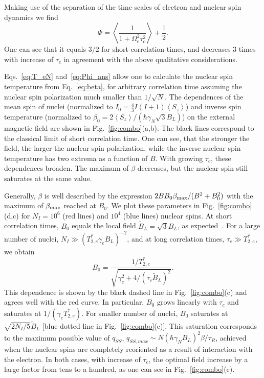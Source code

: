 \documentclass[prl,nobibnotes,twocolumn,aps,longbibliography,superscriptaddress,notoc]{revtex4-1}
\newcommand{\braket}[1]{\left\langle #1 \right\rangle}
\begin{document}
Making use of the separation of the time scales of electron and nuclear spin dynamics we find
\begin{equation}
  \label{eq:Phi_ans}
  \Phi=\left<\frac{1}{1+\Omega_e^2\tau_c^2}\right>+\frac{1}{2}.
\end{equation}
One can see that it equals $3/2$ for short correlation times, and decreases $3$ times with increase of $\tau_c$ in agreement with the above qualitative considerations.

Eqs.~\eqref{eq:T_eN} and~\eqref{eq:Phi_ans} allow one to calculate the nuclear spin temperature from Eq.~\eqref{eq:beta}, for arbitrary correlation time assuming the nuclear spin polarization much smaller than $1/\sqrt{N}$. The dependences of the mean spin of nuclei (normalized to $I_0=\frac{4}{3}I(I+1)\braket{S_z}$) and inverse spin temperature (normalized to $\beta_0=2\braket{S_z}/(\hbar\gamma_N\sqrt{3}B_L)$) on the external magnetic field are shown in Fig.~\ref{fig:combo}(a,b). The black lines correspond to the classical limit of short correlation time. One can see, that the stronger the field, the larger the nuclear spin polarization, while the inverse nuclear spin temperature has two extrema as a function of $B$. With growing $\tau_c$, these dependences broaden. The maximum of $\beta$ decreases, but the nuclear spin still saturates at the same value.

Generally, $\beta$ is well described by the expression $2BB_0\beta_{\rm{max}}/(B^2+B_0^2)$ with the maximum of $\beta_{\rm max}$ reached at $B_0$. We plot these parameters in Fig.~\ref{fig:combo}(d,c) for $N_I=10^6$ (red lines) and $10^4$ (blue lines) nuclear spins. At short correlation times, $B_0$ equals the local field $\tilde{B}_L=\sqrt{3}B_L$, as expected~\cite{dp74}. For a large number of nuclei, $N_I\gg(T_{2,e}^*\gamma_eB_L)^{-2}$, and at long correlation times, $\tau_c\gg T_{2,e}^*$, we obtain~\cite{supp}
\begin{equation}
  \label{eq:B0_anal}
  B_0=\frac{1/T_{2,e}^*}{\sqrt{\gamma_e^2+4/(\tau_c\tilde{B}_L)^2}}.
\end{equation}
This dependence is shown by the black dashed line in Fig.~\ref{fig:combo}(c) and agrees well with the red curve. In particular, $B_0$ grows linearly with $\tau_c$ and saturates at $1/(\gamma_eT_{2,e}^*)$. For smaller number of nuclei, $B_0$ saturates at $\sqrt{2N_I/5}\tilde{B}_L$ [blue dotted line in Fig.~\ref{fig:combo}(c)]. This saturation corresponds to the maximum possible value of $q_{SS}$, $q_{SS,max}\sim N(\hbar\gamma_N B_L)^2\beta/\tau_R$, achieved when the nuclear spins are completely reoriented as a result of interaction with the electron. In both cases, with increase of $\tau_c$, the optimal field increase by a large factor from tens to a hundred, as one can see in Fig.~\ref{fig:combo}(c).
\end{document}
